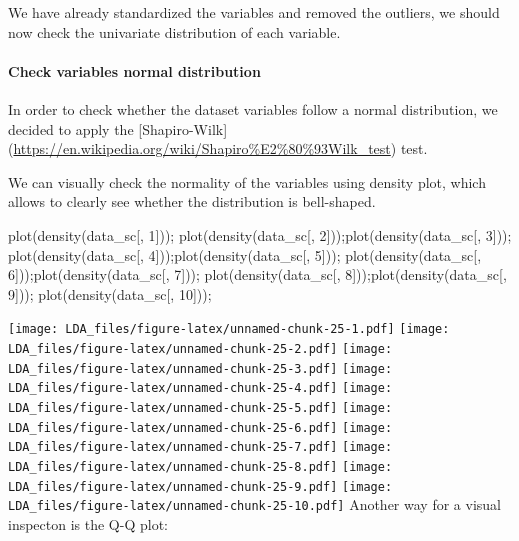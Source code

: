 \documentclass[
]{article}
\newenvironment{Shaded}{\begin{snugshade}}{\end{snugshade}}
\newcommand{\DecValTok}[1]{\textcolor[rgb]{0.00,0.00,0.81}{#1}}
\newcommand{\FunctionTok}[1]{\textcolor[rgb]{0.00,0.00,0.00}{#1}}
\newcommand{\NormalTok}[1]{#1}
\begin{document}
We have already standardized the variables and removed the outliers, we
should now check the univariate distribution of each variable.

\hypertarget{check-variables-normal-distribution}{%
\paragraph{Check variables normal
distribution}\label{check-variables-normal-distribution}}

In order to check whether the dataset variables follow a normal
distribution, we decided to apply the {[}Shapiro-Wilk{]}
(\url{https://en.wikipedia.org/wiki/Shapiro\%E2\%80\%93Wilk_test}) test.

We can visually check the normality of the variables using density plot,
which allows to clearly see whether the distribution is bell-shaped.

\begin{Shaded}
\begin{Highlighting}[]
\FunctionTok{plot}\NormalTok{(}\FunctionTok{density}\NormalTok{(data\_sc[, }\DecValTok{1}\NormalTok{])); }\FunctionTok{plot}\NormalTok{(}\FunctionTok{density}\NormalTok{(data\_sc[, }\DecValTok{2}\NormalTok{]));}\FunctionTok{plot}\NormalTok{(}\FunctionTok{density}\NormalTok{(data\_sc[, }\DecValTok{3}\NormalTok{])); }\FunctionTok{plot}\NormalTok{(}\FunctionTok{density}\NormalTok{(data\_sc[, }\DecValTok{4}\NormalTok{]));}\FunctionTok{plot}\NormalTok{(}\FunctionTok{density}\NormalTok{(data\_sc[, }\DecValTok{5}\NormalTok{])); }\FunctionTok{plot}\NormalTok{(}\FunctionTok{density}\NormalTok{(data\_sc[, }\DecValTok{6}\NormalTok{]));}\FunctionTok{plot}\NormalTok{(}\FunctionTok{density}\NormalTok{(data\_sc[, }\DecValTok{7}\NormalTok{])); }\FunctionTok{plot}\NormalTok{(}\FunctionTok{density}\NormalTok{(data\_sc[, }\DecValTok{8}\NormalTok{]));}\FunctionTok{plot}\NormalTok{(}\FunctionTok{density}\NormalTok{(data\_sc[, }\DecValTok{9}\NormalTok{])); }\FunctionTok{plot}\NormalTok{(}\FunctionTok{density}\NormalTok{(data\_sc[, }\DecValTok{10}\NormalTok{]));}
\end{Highlighting}
\end{Shaded}

\texttt{[image: LDA\_files/figure-latex/unnamed-chunk-25-1.pdf]}
\texttt{[image: LDA\_files/figure-latex/unnamed-chunk-25-2.pdf]}
\texttt{[image: LDA\_files/figure-latex/unnamed-chunk-25-3.pdf]}
\texttt{[image: LDA\_files/figure-latex/unnamed-chunk-25-4.pdf]}
\texttt{[image: LDA\_files/figure-latex/unnamed-chunk-25-5.pdf]}
\texttt{[image: LDA\_files/figure-latex/unnamed-chunk-25-6.pdf]}
\texttt{[image: LDA\_files/figure-latex/unnamed-chunk-25-7.pdf]}
\texttt{[image: LDA\_files/figure-latex/unnamed-chunk-25-8.pdf]}
\texttt{[image: LDA\_files/figure-latex/unnamed-chunk-25-9.pdf]}
\texttt{[image: LDA\_files/figure-latex/unnamed-chunk-25-10.pdf]} Another
way for a visual inspecton is the Q-Q plot:
\end{document}
